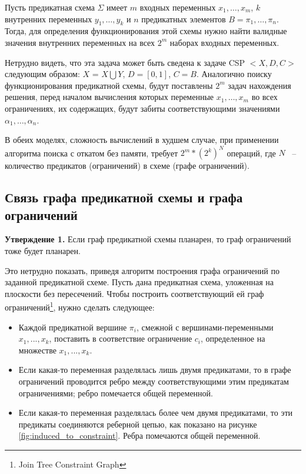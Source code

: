\documentclass[12pt]{article}
\begin{document}
Пусть предикатная схема $\Sigma$ имеет $m$ входных переменных $x_1, \ldots , x_m$, 
$k$ внутренних переменных $y_1, \ldots , y_k$ и $n$ предикатных элементов $B = \pi_1, \dots , \pi_n$. 
Тогда, для определения функционирования этой схемы нужно найти валидные значения внутренних переменных на всех $2^{m}$
наборах входных переменных. 

Нетрудно видеть, что эта задача может быть сведена к задаче CSP $<X, D, C>$ следующим образом:
$X$ = $X \bigcup Y$, $D = [0, 1]$, $C = B$. Аналогично поиску функционирования предикатной схемы, 
будут поставлены $2^m$ задач нахождения решения, перед началом вычисления которых переменные $x_1, \ldots , x_m$ 
во всех ограничениях, их содержащих, будут забиты соответствующими значениями $\alpha_1, \ldots , \alpha_n$.

В обеих моделях, сложность вычислений в худшем случае, при применении алгоритма поиска 
с откатом без памяти, требует $2^m * (2^k)^N$ операций, где $N$ ~-- количество предикатов (ограничений) 
в схеме (графе ограничений).

\subsection{Связь графа предикатной схемы и графа ограничений}

\textbf{Утверждение 1.} Если граф предикатной схемы планарен, то граф ограничений тоже будет планарен.

Это нетрудно показать, приведя алгоритм построения графа ограничений по заданной предикатной схеме. 
Пусть дана предикатная схема, уложенная на плоскости без пересечений. Чтобы построить соответствующий ей граф
ограничений\footnote{Join Tree Constraint Graph}, нужно сделать следующее:
\begin{itemize}
\item Каждой предикатной вершине $\pi_i$, смежной с вершинами-переменными $x_1, ... , x_k$, поставить в соответствие
ограничение $c_i$, определенное на множестве $x_1, ..., x_k$.
\item Если какая-то переменная разделялась лишь двумя предикатами, то в графе ограничений
проводится ребро между соответствующими этим предикатам ограничениями; ребро помечается общей переменной.
\item Если какая-то переменная разделялась более чем двумя предикатами, то эти предикаты соединяются 
реберной цепью, как показано на рисунке \ref{fig:induced_to_constraint}. Ребра помечаются общей переменной.
\end{itemize}
\end{document}
